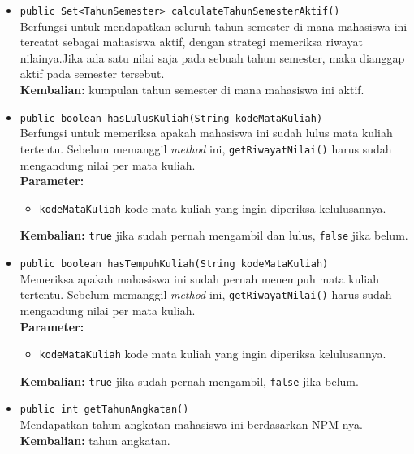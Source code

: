 \begin{itemize}
	\item \texttt{public Set<TahunSemester> calculateTahunSemesterAktif()}\\
		Berfungsi untuk mendapatkan seluruh tahun semester di mana mahasiswa ini tercatat sebagai mahasiswa aktif, dengan strategi memeriksa riwayat nilainya.Jika ada satu nilai saja pada sebuah tahun semester, maka dianggap aktif pada semester tersebut.\\
		\textbf{Kembalian:} kumpulan tahun semester di mana mahasiswa ini aktif.
		
	\item \texttt{public boolean hasLulusKuliah(String kodeMataKuliah)}\\
		Berfungsi untuk memeriksa apakah mahasiswa ini sudah lulus mata kuliah tertentu. Sebelum memanggil \textit{method} ini, \texttt{getRiwayatNilai()} harus sudah mengandung nilai per mata kuliah.\\
		\textbf{Parameter:}
		\begin{itemize}
			\item \texttt{kodeMataKuliah} kode mata kuliah yang ingin diperiksa kelulusannya.
		\end{itemize}
		\textbf{Kembalian:} \texttt{true} jika sudah pernah mengambil dan lulus, \texttt{false} jika belum.
		
	\item \texttt{public boolean hasTempuhKuliah(String kodeMataKuliah)}\\
		Memeriksa apakah mahasiswa ini sudah pernah menempuh mata kuliah tertentu. Sebelum memanggil \textit{method} ini, \texttt{getRiwayatNilai()} harus sudah mengandung nilai per mata kuliah.\\
		\textbf{Parameter:}
		\begin{itemize}
			\item \texttt{kodeMataKuliah} kode mata kuliah yang ingin diperiksa kelulusannya.
		\end{itemize}
		\textbf{Kembalian:} \texttt{true} jika sudah pernah mengambil, \texttt{false} jika belum.
	
	\item \texttt{public int getTahunAngkatan()}\\
		Mendapatkan tahun angkatan mahasiswa ini berdasarkan NPM-nya.\\
		\textbf{Kembalian:} tahun angkatan.
	\end{itemize}


